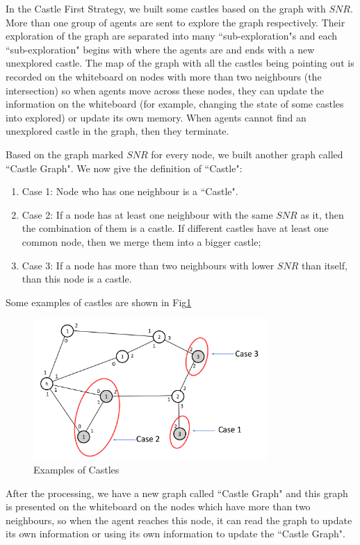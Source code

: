 In the Castle First Strategy, we built some castles based on the graph with $SNR$. More than one group of agents are sent to explore the graph respectively. Their exploration of the graph are separated into many ``sub-exploration"s and each ``sub-exploration" begins with where the agents are and ends with a new unexplored castle. The map of the graph with all the castles being pointing out is recorded on the whiteboard on nodes with more than two neighbours (the intersection) so when agents move across these nodes, they can update the information on the whiteboard (for example, changing the state of some castles into explored) or update its own memory. When agents cannot find an unexplored castle in the graph, then they terminate. 

Based on the graph marked $SNR$ for every node, we built another graph called ``Castle Graph". 
We now give the definition of ``Castle":
\begin{enumerate}
\item Case 1: Node who has one neighbour is a ``Castle".
\item Case 2: If a node has at least one neighbour with the same $SNR$ as it, then the combination of them is a castle. If different castles have at least one common node, then we merge them into a bigger castle;
\item Case 3: If a node has more than two neighbours with lower $SNR$ than itself, than this node is a castle.
\end{enumerate}

Some examples of castles are shown in Fig\ref{fig:CastleExample}
\begin{figure}[H]
  \centering  
  \includegraphics[width=3.5in]{figures/CastleExample.png}
  \caption{Examples of Castles}\label{fig:CastleExample}
\end{figure} 

After the processing, we have a new graph called ``Castle Graph" and this graph is presented on the whiteboard on the nodes which have more than two neighbours, so when the agent reaches this node, it can read the graph to update its own information or using its own information to update the ``Castle Graph". 

